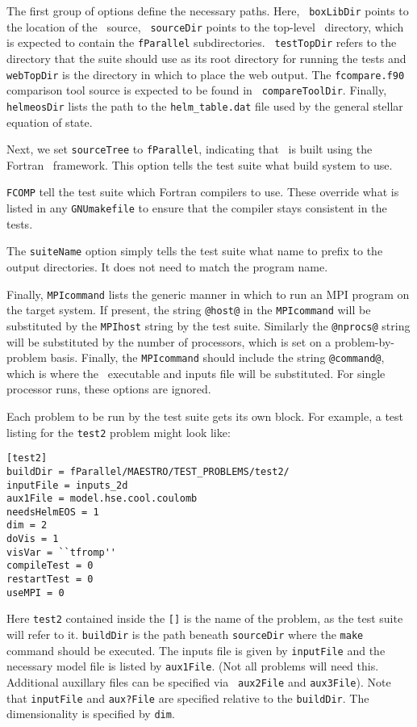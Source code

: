 The first group of options define the necessary paths.  Here, {\tt
  boxLibDir} points to the location of the \boxlib\ source, {\tt
  sourceDir} points to the top-level \maestro\ directory, which is
expected to contain the {\tt fParallel} subdirectories.  {\tt
  testTopDir} refers to the directory that the suite should use as its
root directory for running the tests and {\tt webTopDir} is the
directory in which to place the web output.  The {\tt fcompare.f90}
comparison tool source is expected to be found in {\tt
  compareToolDir}.  Finally, {\tt helmeosDir} lists the path to the
{\tt helm\_table.dat} file used by the general stellar equation of
state.

Next, we set {\tt sourceTree} to {\tt fParallel}, indicating that
\maestro\ is built using the Fortran \boxlib\ framework.  This option
tells the test suite what build system to use.

{\tt FCOMP} tell the test suite which Fortran compilers to use.  These
override what is listed in any {\tt GNUmakefile} to ensure that the
compiler stays consistent in the tests.

The {\tt suiteName} option simply tells the test suite what name to
prefix to the output directories.  It does not need to match the
program name.  

Finally, {\tt MPIcommand} lists the generic manner in which to run an
MPI program on the target system.  If present, the string {\tt @host@}
in the {\tt MPIcommand} will be substituted by the {\tt MPIhost}
string by the test suite.  Similarly the {\tt @nprocs@} string will be
substituted by the number of processors, which is set on a
problem-by-problem basis.  Finally, the {\tt MPIcommand} should
include the string {\tt @command@}, which is where the
\maestro\ executable and inputs file will be substituted.  For single
processor runs, these options are ignored.

Each problem to be run by the test suite gets its own block.  For
example, a test listing for the {\tt test2} problem might look like:

\begin{lstlisting}
[test2]
buildDir = fParallel/MAESTRO/TEST_PROBLEMS/test2/
inputFile = inputs_2d
aux1File = model.hse.cool.coulomb
needsHelmEOS = 1
dim = 2
doVis = 1
visVar = ``tfromp''
compileTest = 0 
restartTest = 0
useMPI = 0
\end{lstlisting}

Here {\tt test2} contained inside the {\tt []} is the name of the
problem, as the test suite will refer to it.  {\tt buildDir} is the
path beneath {\tt sourceDir} where the {\tt make} command should be
executed.  The inputs file is given by {\tt inputFile} and the
necessary model file is listed by {\tt aux1File}. (Not all problems
will need this.  Additional auxillary files can be specified via {\tt
  aux2File} and {\tt aux3File}).  Note that {\tt inputFile} and {\tt aux?File} are
specified relative to the {\tt buildDir}. The dimensionality is specified by {\tt dim}.

